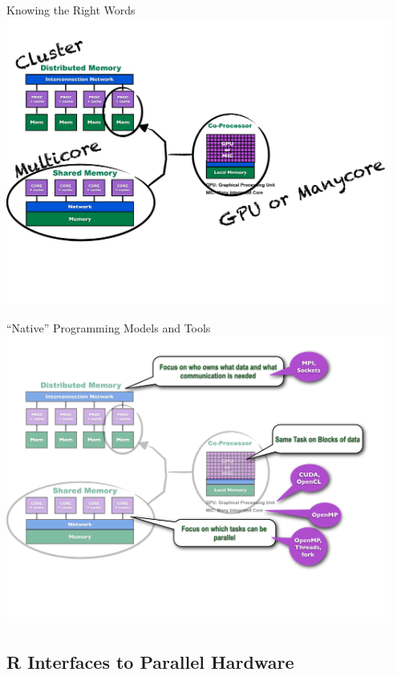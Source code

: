 \begin{frame}
  \begin{block}{Knowing the Right Words}
    \includegraphics[width=0.95\textwidth]{../common/pics/ParallelHardware5.pdf}
  \end{block}
\end{frame}

\begin{frame}
  \begin{block}{``Native'' Programming Models and Tools}
    \includegraphics[width=0.95\textwidth]{../common/pics/ParallelHardware6.pdf}
  \end{block}
\end{frame}

\subsection{R Interfaces to Parallel Hardware}

